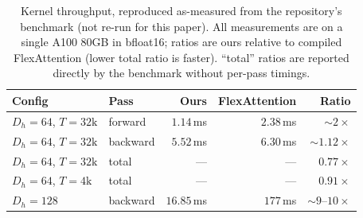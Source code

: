 \begin{table}[t]
  \centering
  \small
  \begin{tabular}{@{}llrrr@{}}
    \toprule
    Config & Pass & Ours & FlexAttention & Ratio \\
    \midrule
    $D_h{=}64$, $T{=}32\text{k}$ & forward  & $1.14$\,ms  & $2.38$\,ms  & $\sim2\times$ \\
    $D_h{=}64$, $T{=}32\text{k}$ & backward & $5.52$\,ms  & $6.30$\,ms  & $\sim1.12\times$ \\
    $D_h{=}64$, $T{=}32\text{k}$ & total    & ---         & ---         & $0.77\times$ \\
    $D_h{=}64$, $T{=}4\text{k}$  & total    & ---         & ---         & $0.91\times$ \\
    $D_h{=}128$                  & backward & $16.85$\,ms & $177$\,ms   & $\sim9$--$10\times$ \\
    \bottomrule
  \end{tabular}
  \caption{Kernel throughput, reproduced as-measured from the repository's benchmark
  (not re-run for this paper). All measurements are on a single A100 80GB in bfloat16;
  ratios are ours relative to compiled FlexAttention (lower total ratio is faster).
  ``total'' ratios are reported directly by the benchmark without per-pass timings.}
  \label{tab:kernel-speed}
\end{table}

